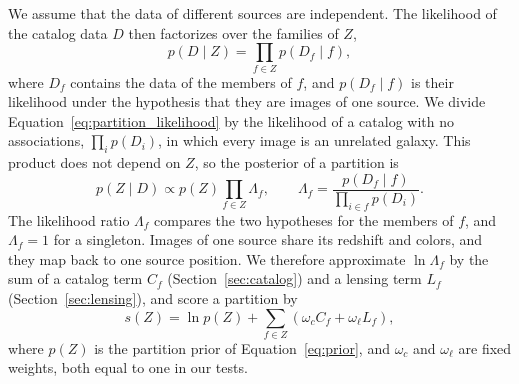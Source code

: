 \documentclass[twocolumn,twocolappendix,linenumbers]{aastex701}
\begin{document}
We assume that the data of different sources are independent.
The likelihood of the catalog data $D$ then factorizes over the families of $Z$,
\begin{equation}
p(D\mid Z)=\prod_{f\in Z}p(D_f\mid f),
\label{eq:partition_likelihood}
\end{equation}
where $D_f$ contains the data of the members of $f$, and $p(D_f\mid f)$ is their likelihood under the hypothesis that they are images of one source.
We divide Equation~\ref{eq:partition_likelihood} by the likelihood of a catalog with no associations, $\prod_ip(D_i)$, in which every image is an unrelated galaxy.
This product does not depend on $Z$, so the posterior of a partition is
\begin{equation}
p(Z\mid D)\propto p(Z)\prod_{f\in Z}\Lambda_f,
\qquad
\Lambda_f=\frac{p(D_f\mid f)}{\prod_{i\in f}p(D_i)}.
\label{eq:family_ratio}
\end{equation}
The likelihood ratio $\Lambda_f$ compares the two hypotheses for the members of $f$, and $\Lambda_f=1$ for a singleton.
Images of one source share its redshift and colors, and they map back to one source position.
We therefore approximate $\ln\Lambda_f$ by the sum of a catalog term $C_f$ (Section~\ref{sec:catalog}) and a lensing term $L_f$ (Section~\ref{sec:lensing}), and score a partition by
\begin{equation}
s(Z)=\ln p(Z)+\sum_{f\in Z}\left(\omega_cC_f+\omega_\ell L_f\right),
\label{eq:score}
\end{equation}
where $p(Z)$ is the partition prior of Equation~\ref{eq:prior}, and $\omega_c$ and $\omega_\ell$ are fixed weights, both equal to one in our tests.
\end{document}
